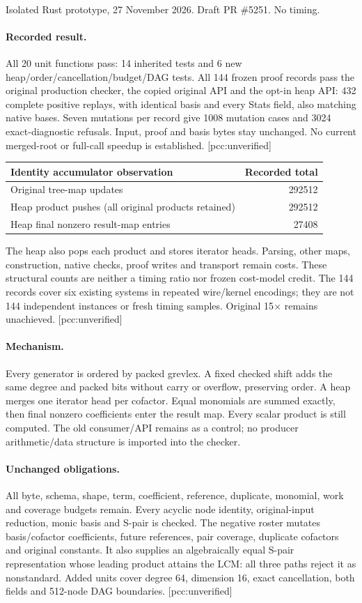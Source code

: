 \documentclass[10pt,a4paper]{article}
\begin{document}
\\[4pt]
{\small Isolated Rust prototype, 27 November 2026. Draft PR \#5251. No timing.}
\paragraph{Recorded result.} All 20 unit functions pass: 14 inherited tests and 6 new
heap/order/cancellation/budget/DAG tests. All 144 frozen proof records pass the
original production checker, the copied original API and the opt-in heap API:
432 complete positive replays, with identical basis and every Stats field,
also matching native bases. Seven mutations per record give 1008 mutation cases
and 3024 exact-diagnostic refusals. Input, proof and basis bytes stay unchanged.
No current merged-root or full-call speedup is established. [pcc:unverified]
\begin{center}\begin{tabular}{lr}\toprule
Identity accumulator observation & Recorded total\\\midrule
Original tree-map updates & 292512\\
Heap product pushes (all original products retained) & 292512\\
Heap final nonzero result-map entries & 27408\\\bottomrule
\end{tabular}\end{center}
\noindent The heap also pops each product and stores iterator heads. Parsing,
other maps, construction, native checks, proof writes and transport remain
costs. These structural counts are neither a timing ratio nor frozen cost-model
credit. The 144 records cover six existing systems in repeated wire/kernel
encodings; they are not 144 independent instances or fresh timing samples.
Original 15$\times$ remains unachieved. [pcc:unverified]
\paragraph{Mechanism.} Every generator is ordered by packed grevlex. A fixed
checked shift adds the same degree and packed bits without carry or overflow,
preserving order. A heap merges one iterator head per cofactor. Equal monomials
are summed exactly, then final nonzero coefficients enter the result map.
Every scalar product is still computed. The old consumer/API remains as a
control; no producer arithmetic/data structure is imported into the checker.
\paragraph{Unchanged obligations.} All byte, schema, shape, term, coefficient,
reference, duplicate, monomial, work and coverage budgets remain. Every acyclic
node identity, original-input reduction, monic basis and S-pair is checked.
The negative roster mutates basis/cofactor coefficients, future references,
pair coverage, duplicate cofactors and original constants. It also supplies an
algebraically equal S-pair representation whose leading product attains the
LCM: all three paths reject it as nonstandard. Added units cover degree 64,
dimension 16, exact cancellation, both fields and 512-node DAG boundaries.
[pcc:unverified]
\end{document}
